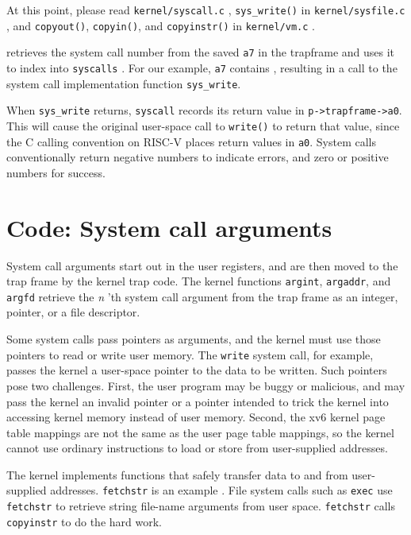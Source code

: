 At this point, please read \lstinline{kernel/syscall.c} ,
{\tt sys\_write()} in \lstinline{kernel/sysfile.c} ,
and {\tt copyout()}, {\tt copyin()}, and {\tt copyinstr()} in \lstinline{kernel/vm.c} .

retrieves the system call number from the saved
\texttt{a7} in the trapframe
and uses it to index into {\tt syscalls}
.
For our example, 
\texttt{a7}
contains 
,
resulting in a call to the system call implementation function
\lstinline{sys_write}.

When \lstinline{sys_write} returns,
\lstinline{syscall}
records its return value in
\lstinline{p->trapframe->a0}.
This will cause the original user-space call to 
{\tt write()} to return that value, since the C
calling convention on RISC-V places return values in {\tt a0}.
System calls conventionally return negative numbers to indicate
errors, and zero or positive numbers for success.

\section{Code: System call arguments}

System call arguments start out in the user registers, and
are then moved to the trap frame by the kernel trap code.
The kernel functions
\lstinline{argint},
\lstinline{argaddr},
and
\lstinline{argfd}
retrieve the 
\textit{n} 'th 
system call argument
from the trap frame
as an integer, pointer, or a file descriptor.

Some system calls pass pointers as arguments, and the kernel must use
those pointers to read or write user memory. The {\tt write} system
call, for example, passes the kernel a user-space pointer
to the data to be written.
Such pointers pose
two challenges. First, the user program may be buggy or malicious, and
may pass the kernel an invalid pointer or a pointer intended to trick
the kernel into accessing kernel memory instead of user memory.
Second, the xv6 kernel page table mappings are not the same as the
user page table mappings, so the kernel cannot use ordinary
instructions to load or store from user-supplied addresses.

The kernel implements functions that safely transfer data to and
from user-supplied addresses.
{\tt fetchstr} is an example .
File system calls such as
{\tt exec} use {\tt fetchstr} to retrieve string file-name arguments from user
space.
\lstinline{fetchstr} calls \lstinline{copyinstr}
to do the hard work.

